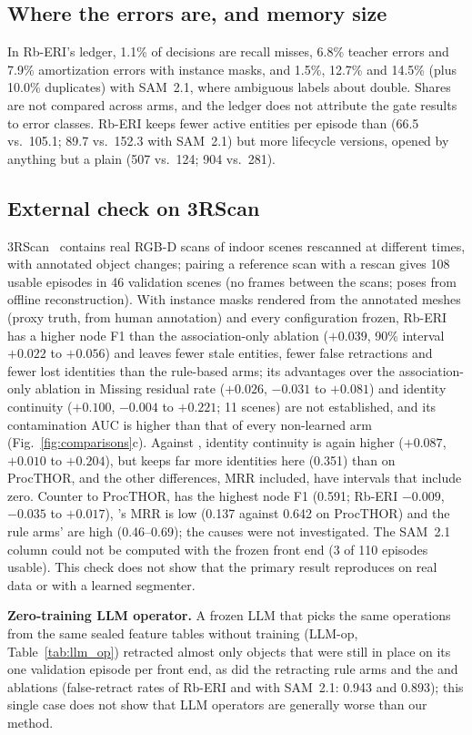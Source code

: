 \subsection{Where the errors are, and memory size}
In Rb-ERI's ledger, 1.1\% of decisions are recall misses, 6.8\% teacher errors and 7.9\% amortization errors with instance masks, and 1.5\%, 12.7\% and 14.5\% (plus 10.0\% duplicates) with SAM~2.1, where ambiguous labels about double. Shares are not compared across arms, and the ledger does not attribute the gate results to error classes.
Rb-ERI keeps fewer active entities per episode than  (66.5 vs.\ 105.1; 89.7 vs.\ 152.3 with SAM~2.1) but more lifecycle versions, opened by anything but a plain  (507 vs.\ 124; 904 vs.\ 281).

\subsection{External check on 3RScan}
\label{sec:external}
3RScan~\cite{rio2019} contains real RGB-D scans of indoor scenes rescanned at different times, with annotated object changes; pairing a reference scan with a rescan gives 108 usable episodes in 46 validation scenes (no frames between the scans; poses from offline reconstruction).
With instance masks rendered from the annotated meshes (proxy truth, from human annotation) and every configuration frozen, Rb-ERI has a higher node F1 than the association-only ablation ($+0.039$, 90\% interval $+0.022$ to $+0.056$) and leaves fewer stale entities, fewer false retractions and fewer lost identities than the rule-based arms; its advantages over the association-only ablation in Missing residual rate ($+0.026$, $-0.031$ to $+0.081$) and identity continuity ($+0.100$, $-0.004$ to $+0.221$; 11 scenes) are not established, and its contamination AUC is higher than that of every non-learned arm (Fig.~\ref{fig:comparisons}c).
Against , identity continuity is again higher ($+0.087$, $+0.010$ to $+0.204$), but  keeps far more identities here (0.351) than on ProcTHOR, and the other differences, MRR included, have intervals that include zero.
Counter to ProcTHOR,  has the highest node F1 (0.591; Rb-ERI $-0.009$, $-0.035$ to $+0.017$), 's MRR is low (0.137 against 0.642 on ProcTHOR) and the rule arms' are high (0.46--0.69); the causes were not investigated.
The SAM~2.1 column could not be computed with the frozen front end (3 of 110 episodes usable).
This check does not show that the primary result reproduces on real data or with a learned segmenter.

\textbf{Zero-training LLM operator.}
A frozen LLM that picks the same operations from the same sealed feature tables without training (LLM-op, Table~\ref{tab:llm_op}) retracted almost only objects that were still in place on its one validation episode per front end, as did the retracting rule arms and the  and  ablations (false-retract rates of Rb-ERI and  with SAM~2.1: 0.943 and 0.893); this single case does not show that LLM operators are generally worse than our method.
